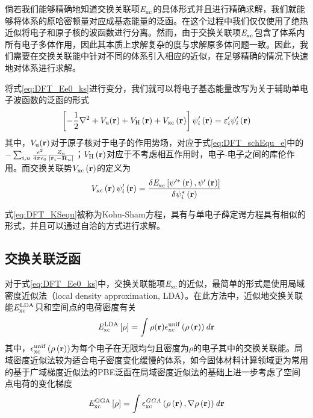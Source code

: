 倘若我们能够精确地知道交换关联项$\it E_{\rm xc}^{\rm } \it$的具体形式并且进行精确求解，我们就能够将体系的原哈密顿量对应成基态能量的泛函。在这个过程中我们仅仅使用了绝热近似将电子和原子核的波函数进行分离。然而，由于交换关联项$\it E_{\rm xc}^{\rm } \it$包含了体系内所有电子多体作用，因此其本质上求解复杂的度与求解原多体问题一致。因此，我们需要在交换关联能中针对不同的体系引入相应的近似，在足够精确的情况下快速地对体系进行求解。

将式\ref{eq:DFT_Ee0_ks}进行变分，我们就可以将电子基态能量改写为关于辅助单电子波函数的泛函的形式\chinesecolon
\begin{equation}
    \label{eq:DFT_KSequ}
    \left[-\frac{1}{2}\nabla^2+V_{\rm u}({\mathbf r})+V_{\rm H}\left({\mathbf r}\right)+V_{\rm xc}\left({\mathbf r}\right)\right]\psi'_i\left({\mathbf r}\right)=\varepsilon'_i\psi'_i\left({\mathbf r}\right) 
\end{equation}
其中，$V_{\rm u}({\mathbf r})$对于原子核对于电子的作用势场，对应于式\ref{eq:DFT_schEqu_e}中的$-\sum_{i,u}\frac{e^2}{4\pi\epsilon_0}\frac{Z_{\rm u}}{\left\lvert{\mathbf r}_i - {\mathbf R}_u\right\rvert}$；$V_{\rm H}\left({\mathbf r}\right)$对应于不考虑相互作用时，电子-电子之间的库伦作用。而交换关联势$V_{\rm xc}\left({\mathbf r}\right)$的定义为\chinesecolon
\[
    V_{\rm xc}\left({\mathbf r}\right)\psi'_i\left({\mathbf r}\right)=\frac{\delta \it E_{\rm xc}^{\rm } \it\left[\psi'^*\left({\mathbf r}\right),\psi'\left({\mathbf r}\right)\right]}{\delta \psi_i^*\left({\mathbf r}\right)}
\]

式\ref{eq:DFT_KSequ}被称为Kohn-Sham方程，具有与单电子薛定谔方程具有相似的形式，并且可以通过自洽的方式进行求解。

\subsection{交换关联泛函}

对于式\ref{eq:DFT_Ee0_ks}中，交换关联能项$\it E_{\rm xc}^{\rm } \it$的近似，最简单的形式是使用局域密度近似法（local density approximation, LDA）。在此方法中，近似地交换关联能$\it E_{\rm xc}^{\rm LDA} \it$只和空间点的电荷密度有关\chinesecolon
\begin{equation}
    \label{eq:DFT_LDA}
    \it E_{\rm xc}^{\rm LDA} \it\left[\rho\right]=\int \rho({\mathbf r}) \epsilon_{\rm xc}^{\rm unif} \left(\rho\left({\mathbf r}\right)\right) d{\mathbf r}
\end{equation}
其中，$\epsilon_{\rm xc}^{\rm unif}\left(\rho\left({\mathbf r}\right)\right)$为每个电子在无限均匀且密度为$\rho$的电子其中的交换关联能。局域密度近似法较为适合电子密度变化缓慢的体系，如今固体材料计算领域更为常用的基于广域梯度近似法的PBE泛函在局域密度近似法的基础上进一步考虑了空间点电荷的变化梯度\chinesecolon
\begin{equation}
    \it E_{\rm xc}^{\rm GGA} \it\left[\rho\right]=\int\epsilon_{\rm xc}^{GGA}\left(\rho\left({\mathbf r}\right),\nabla\rho\left({\mathbf r}\right)\right)d{\mathbf r}
\end{equation}

